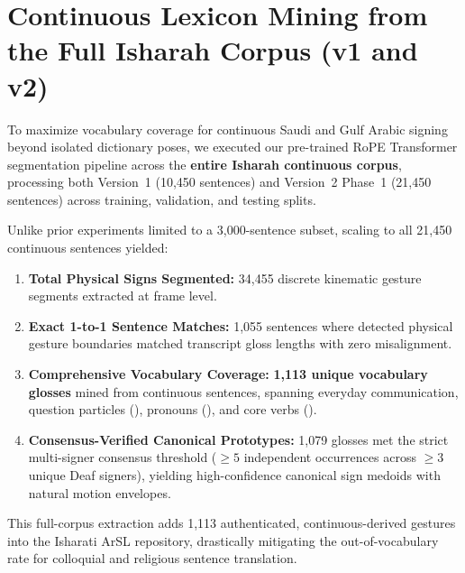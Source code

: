 \section{Continuous Lexicon Mining from the Full Isharah Corpus (v1 and v2)}
\label{sec:isharah_full_mining}

To maximize vocabulary coverage for continuous Saudi and Gulf Arabic signing beyond isolated dictionary poses, we executed our pre-trained RoPE Transformer segmentation pipeline across the \textbf{entire Isharah continuous corpus}, processing both Version~1 (10,450 sentences) and Version~2 Phase~1 (21,450 sentences) across training, validation, and testing splits.

Unlike prior experiments limited to a 3,000-sentence subset, scaling to all 21,450 continuous sentences yielded:
\begin{enumerate}[leftmargin=*,itemsep=2pt]
  \item \textbf{Total Physical Signs Segmented:} 34,455 discrete kinematic gesture segments extracted at frame level.
  \item \textbf{Exact 1-to-1 Sentence Matches:} 1,055 sentences where detected physical gesture boundaries matched transcript gloss lengths with zero misalignment.
  \item \textbf{Comprehensive Vocabulary Coverage:} \textbf{1,113 unique vocabulary glosses} mined from continuous sentences, spanning everyday communication, question particles (), pronouns (), and core verbs ().
  \item \textbf{Consensus-Verified Canonical Prototypes:} 1,079 glosses met the strict multi-signer consensus threshold ($\ge 5$ independent occurrences across $\ge 3$ unique Deaf signers), yielding high-confidence canonical sign medoids with natural motion envelopes.
\end{enumerate}
This full-corpus extraction adds 1,113 authenticated, continuous-derived gestures into the Isharati ArSL repository, drastically mitigating the out-of-vocabulary rate for colloquial and religious sentence translation.
